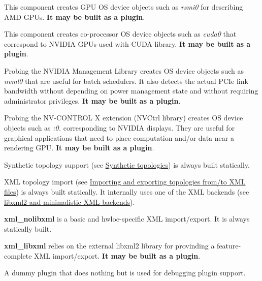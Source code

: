 \begin{DoxyDescription}
\item[rsmi ]This component creates G\+PU OS device objects such as {\itshape rsmi0} for describing A\+MD G\+P\+Us. {\bfseries It may be built as a plugin}.  
\item[cuda ]This component creates co-\/processor OS device objects such as {\itshape cuda0} that correspond to N\+V\+I\+D\+IA G\+P\+Us used with C\+U\+DA library. {\bfseries It may be built as a plugin}.  
\item[nvml ]Probing the N\+V\+I\+D\+IA Management Library creates OS device objects such as {\itshape nvml0} that are useful for batch schedulers. It also detects the actual P\+C\+Ie link bandwidth without depending on power management state and without requiring administrator privileges. {\bfseries It may be built as a plugin}.  
\item[gl ]Probing the N\+V-\/\+C\+O\+N\+T\+R\+OL X extension (N\+V\+Ctrl library) creates OS device objects such as {\itshape \+:0.} corresponding to N\+V\+I\+D\+IA displays. They are useful for graphical applications that need to place computation and/or data near a rendering G\+PU. {\bfseries It may be built as a plugin}.  
\item[synthetic ]Synthetic topology support (see \hyperlink{a00389}{Synthetic topologies}) is always built statically.  
\item[xml ]X\+ML topology import (see \hyperlink{a00388}{Importing and exporting topologies from/to X\+ML files}) is always built statically. It internally uses one of the X\+ML backends (see \hyperlink{a00388_xml_backends}{libxml2 and minimalistic X\+ML backends}). 
\begin{DoxyItemize}
\item {\bfseries xml\+\_\+nolibxml} is a basic and hwloc-\/specific X\+ML import/export. It is always statically built.  
\item {\bfseries xml\+\_\+libxml} relies on the external libxml2 library for provinding a feature-\/complete X\+ML import/export. {\bfseries It may be built as a plugin}.   
\end{DoxyItemize}
\item[fake ]A dummy plugin that does nothing but is used for debugging plugin support.  
\end{DoxyDescription}